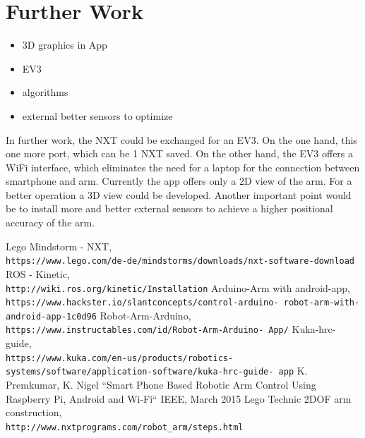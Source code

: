 \documentclass[conference]{IEEEtran}
\begin{document}
\section{Further Work}
\begin{itemize}
	\item 3D graphics in App
	\item EV3
	\item algorithms
	\item external better sensors to optimize
\end{itemize}
In further work, the NXT could be exchanged for an EV3. On the one hand, this one more port, which can be 1 NXT saved. On the other hand, the EV3 offers a WiFi interface, which eliminates the need for a laptop for the connection between smartphone and arm.
Currently the app offers only a 2D view of the arm. For a better operation a 3D view could be developed.
Another important point would be to install more and better external sensors to achieve a higher positional accuracy of the arm.

\begin{thebibliography}{00}
Lego Mindstorm - NXT,
\\\texttt{https://www.lego.com/de-de/mindstorms/downloads/nxt-software-download}
ROS - Kinetic,
\\\texttt{http://wiki.ros.org/kinetic/Installation}
Arduino-Arm with android-app,
\\\texttt{https://www.hackster.io/slantconcepts/control-arduino-
	robot-arm-with-android-app-1c0d96}
Robot-Arm-Arduino,
\\\texttt{https://www.instructables.com/id/Robot-Arm-Arduino-
	App/}
Kuka-hrc-guide,
\\\texttt{https://www.kuka.com/en-us/products/robotics-
	systems/software/application-software/kuka-hrc-guide-
	app}
K. Premkumar, K. Nigel ``Smart Phone Based Robotic Arm Control Using
Raspberry Pi, Android and Wi-Fi`` IEEE, March 2015
Lego Technic 2DOF arm construction,
\\\texttt{http://www.nxtprograms.com/robot_arm/steps.html}

\end{thebibliography}
\end{document}
